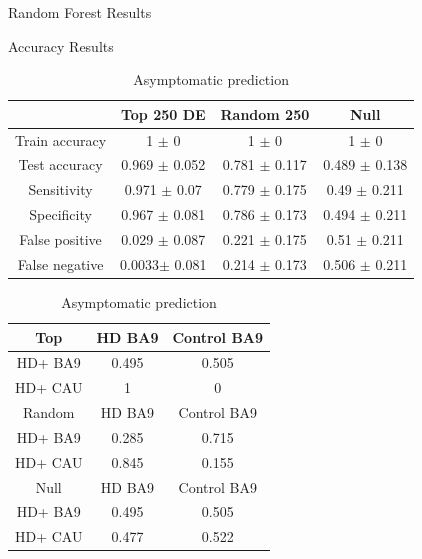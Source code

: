 \documentclass[fleqn,10pt,table]{wlscirep}
\begin{document}
\begin{table}[ht]
\caption{Random Forest Results}
\begin{subtable}{.5\linewidth}
\centering
\caption{Accuracy Results}
\begin{tabular}{cccc} \hline
					& Top 250 DE 		& Random 250	& Null	\\ \hline
Train accuracy		& 1	$\pm$ 0			& 1	$\pm$ 0		& 1	$\pm$ 0				\\ 
Test accuracy		& 0.969	$\pm$ 0.052	& 0.781 $\pm$ 0.117		& 0.489 $\pm$ 0.138		\\ 
Sensitivity			& 0.971	$\pm$ 0.07	& 0.779	$\pm$ 0.175		& 0.49 $\pm$ 0.211		\\ 
Specificity			& 0.967	$\pm$ 0.081	& 0.786	$\pm$ 0.173		& 0.494 $\pm$ 0.211		\\ 
False positive		& 0.029	$\pm$ 0.087	& 0.221	$\pm$ 0.175		& 0.51 $\pm$ 0.211		\\ 
False negative		& 0.0033$\pm$ 0.081	& 0.214	$\pm$ 0.173		& 0.506 $\pm$ 0.211		\\ \hline
\end{tabular}
\end{subtable}%
\begin{subtable}{.5\linewidth}
\centering
\caption{Asymptomatic prediction}
\begin{tabular}{ccc} \hline
Top 		& HD BA9 	& Control BA9   \\ \hline
HD+ BA9   	& 0.495 	& 0.505			\\
HD+ CAU   	& 1			& 0			\\ \hline
Random   	& HD BA9 	& Control BA9		\\ \hline
HD+ BA9   	& 0.285		& 0.715			\\
HD+ CAU   	& 0.845		& 0.155			\\ \hline
Null 		& HD BA9 	& Control BA9		\\ \hline
HD+ BA9   	& 0.495		& 0.505		\\
HD+ CAU   	& 0.477		& 0.522		\\ \hline
\end{tabular}
\end{subtable} 
\end{table}
\end{document}
